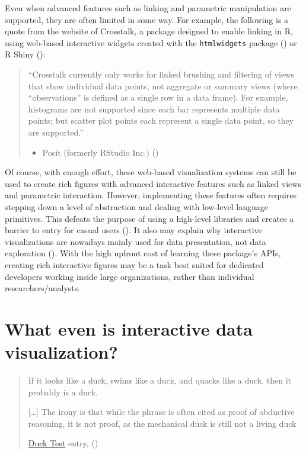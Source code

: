 \documentclass[
]{book}
\providecommand{\tightlist}{%
  \setlength{\itemsep}{0pt}\setlength{\parskip}{0pt}}
\begin{document}
Even when advanced features such as linking and parametric manipulation are supported, they are often limited in some way. For example, the following is a quote from the website of Crosstalk, a package designed to enable linking in R, using web-based interactive widgets created with the \texttt{htmlwidgets} package () or R Shiny ():

\begin{quote}
``Crosstalk currently only works for linked brushing and filtering of views that show individual data points, not aggregate or summary views (where ``observations'' is defined as a single row in a data frame). For example, histograms are not supported since each bar represents multiple data points; but scatter plot points each represent a single data point, so they are supported.''

\begin{itemize}
\tightlist
\item
  Posit (formerly RStudio Inc.) ()
\end{itemize}
\end{quote}

Of course, with enough effort, these web-based visualization systems can still be used to create rich figures with advanced interactive features such as linked views and parametric interaction. However, implementing these features often requires stepping down a level of abstraction and dealing with low-level language primitives. This defeats the purpose of using a high-level libraries and creates a barrier to entry for casual users (). It also may explain why interactive visualizations are nowadays mainly used for data presentation, not data exploration (). With the high upfront cost of learning these package's APIs, creating rich interactive figures may be a task best suited for dedicated developers working inside large organizations, rather than individual researchers/analysts.

\section{What even is interactive data visualization?}\label{what-is-interactive-visualization}

\begin{quote}
If it looks like a duck, swims like a duck, and quacks like a duck, then it probably is a duck.

{[}\ldots{]} The irony is that while the phrase is often cited as proof of abductive reasoning, it is not proof, as the mechanical duck is still not a living duck

\href{https://en.wikipedia.org/wiki/Duck_test}{Duck Test} entry, ()
\end{quote}
\end{document}
